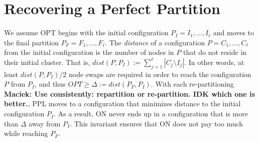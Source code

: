\documentclass[manuscript,screen=true]{acmart}
\newcommand{\OPT}{\mathit{OPT}}
\newcommand{\PPOBRP}{PP-BRP}
\newcommand\mahmoud[1]{\color{green}\textbf{\\ Mahmoud: #1}\\\color{black}}
\newcommand\maciek[1]{\color{brown}\textbf{\\ Maciek: #1}\color{black}}
\begin{document}
\section{Recovering a Perfect Partition}	\label{sec:ppl}

     
We assume OPT begins with the initial configuration
$P_I = I_1, \dots, I_{\ell}$ and moves to the final partition
$P_F = F_1, \dots, F_{\ell}$.
 The \emph{distance} of a configuration $P = C_1, \dots, C_{\ell}$ from the initial configuration is the number of nodes in $P$ that do not reside in their initial cluster.
    That is,
    $\mathit{dist}(P, P_I) := \sum_{j=1}^{\ell} | C_j \setminus I_j |$. 
In other words,
at least $\mathit{dist}(P, P_I)/2$ node swaps are required in order to reach the configuration $P$ from $P_I$, and thus
$\OPT \geq \Delta:= dist(P_F, P_I) $.
 With each re-partitioning\maciek{Use consistently: repartition or re-partition. IDK which one is better.},
  PPL moves to a configuration that minimizes distance to the initial configuration $P_I$.
As a result,
ON never ends up in a configuration that is more than $\Delta$ away from $P_I$.
This invariant ensures that ON does not pay too much while reaching $P_F$.
\end{document}
